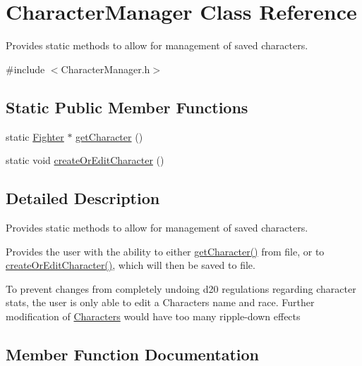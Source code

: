 \hypertarget{class_character_manager}{}\section{Character\+Manager Class Reference}
\label{class_character_manager}


Provides static methods to allow for management of saved characters.  




{\ttfamily \#include $<$Character\+Manager.\+h$>$}

\subsection*{Static Public Member Functions}
\begin{DoxyCompactItemize}
\item 
static \hyperlink{class_fighter}{Fighter} $\ast$ \hyperlink{class_character_manager_a2b13fedd6c3913ae52a9be8051300276}{get\+Character} ()
\item 
static void \hyperlink{class_character_manager_adec8bcfbce9bbb46052655e75d8f496f}{create\+Or\+Edit\+Character} ()
\end{DoxyCompactItemize}


\subsection{Detailed Description}
Provides static methods to allow for management of saved characters. 

Provides the user with the ability to either \hyperlink{class_character_manager_a2b13fedd6c3913ae52a9be8051300276}{get\+Character()} from file, or to \hyperlink{class_character_manager_adec8bcfbce9bbb46052655e75d8f496f}{create\+Or\+Edit\+Character()}, which will then be saved to file. 

To prevent changes from completely undoing d20 regulations regarding character stats, the user is only able to edit a Character\textquotesingle{}s name and race. Further modification of \hyperlink{class_characters}{Characters} would have too many ripple-\/down effects 

\subsection{Member Function Documentation}
\hypertarget{class_character_manager_adec8bcfbce9bbb46052655e75d8f496f}{}\label{class_character_manager_adec8bcfbce9bbb46052655e75d8f496f} 
